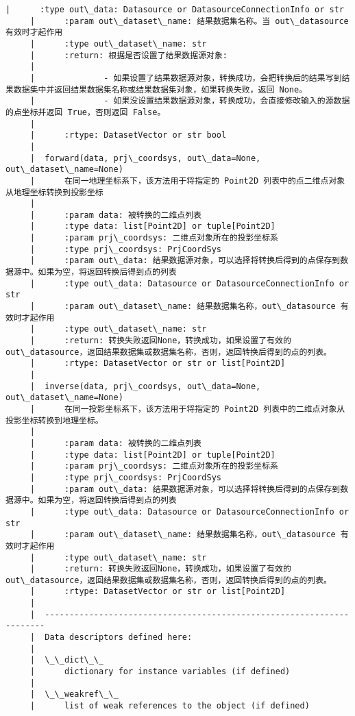 \documentclass[11pt]{article}
\begin{document}
\begin{Verbatim}[commandchars=\\\{\}]
     |      :type out\_data: Datasource or DatasourceConnectionInfo or str
     |      :param out\_dataset\_name: 结果数据集名称。当 out\_datasource 有效时才起作用
     |      :type out\_dataset\_name: str
     |      :return: 根据是否设置了结果数据源对象:
     |      
     |              - 如果设置了结果数据源对象，转换成功，会把转换后的结果写到结果数据集中并返回结果数据集名称或结果数据集对象，如果转换失败，返回 None。
     |              - 如果没设置结果数据源对象，转换成功，会直接修改输入的源数据的点坐标并返回 True，否则返回 False。
     |      
     |      :rtype: DatasetVector or str bool
     |  
     |  forward(data, prj\_coordsys, out\_data=None, out\_dataset\_name=None)
     |      在同一地理坐标系下，该方法用于将指定的 Point2D 列表中的点二维点对象从地理坐标转换到投影坐标
     |      
     |      :param data: 被转换的二维点列表
     |      :type data: list[Point2D] or tuple[Point2D]
     |      :param prj\_coordsys: 二维点对象所在的投影坐标系
     |      :type prj\_coordsys: PrjCoordSys
     |      :param out\_data: 结果数据源对象，可以选择将转换后得到的点保存到数据源中。如果为空，将返回转换后得到点的列表
     |      :type out\_data: Datasource or DatasourceConnectionInfo or str
     |      :param out\_dataset\_name: 结果数据集名称，out\_datasource 有效时才起作用
     |      :type out\_dataset\_name: str
     |      :return: 转换失败返回None，转换成功，如果设置了有效的 out\_datasource，返回结果数据集或数据集名称，否则，返回转换后得到的点的列表。
     |      :rtype: DatasetVector or str or list[Point2D]
     |  
     |  inverse(data, prj\_coordsys, out\_data=None, out\_dataset\_name=None)
     |      在同一投影坐标系下，该方法用于将指定的 Point2D 列表中的二维点对象从投影坐标转换到地理坐标。
     |      
     |      :param data: 被转换的二维点列表
     |      :type data: list[Point2D] or tuple[Point2D]
     |      :param prj\_coordsys: 二维点对象所在的投影坐标系
     |      :type prj\_coordsys: PrjCoordSys
     |      :param out\_data: 结果数据源对象，可以选择将转换后得到的点保存到数据源中。如果为空，将返回转换后得到点的列表
     |      :type out\_data: Datasource or DatasourceConnectionInfo or str
     |      :param out\_dataset\_name: 结果数据集名称，out\_datasource 有效时才起作用
     |      :type out\_dataset\_name: str
     |      :return: 转换失败返回None，转换成功，如果设置了有效的 out\_datasource，返回结果数据集或数据集名称，否则，返回转换后得到的点的列表。
     |      :rtype: DatasetVector or str or list[Point2D]
     |  
     |  ----------------------------------------------------------------------
     |  Data descriptors defined here:
     |  
     |  \_\_dict\_\_
     |      dictionary for instance variables (if defined)
     |  
     |  \_\_weakref\_\_
     |      list of weak references to the object (if defined)
    

\end{Verbatim}
\end{document}

